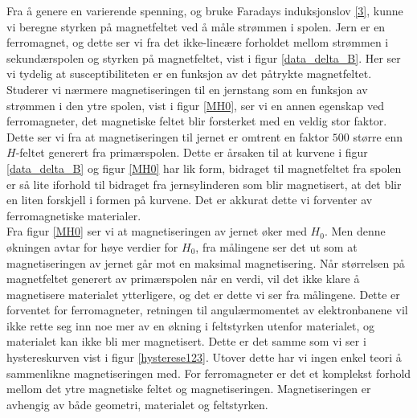 \documentclass[%
 reprint,
 amsmath,amssymb,
 aps,
 norsk,
]{revtex4-1}
\begin{document}
Fra å genere en varierende spenning, og bruke Faradays induksjonslov \eqref{3}, kunne vi beregne styrken på magnetfeltet ved å måle strømmen i spolen. Jern er en ferromagnet, og dette ser vi fra det ikke-lineære forholdet mellom strømmen i sekundærspolen og styrken på magnetfeltet, vist i figur \vref{data_delta_B}. Her ser vi tydelig at susceptibiliteten er en funksjon av det påtrykte magnetfeltet. Studerer vi nærmere magnetiseringen til en jernstang som en funksjon av strømmen i den ytre spolen, vist i figur \vref{MH0}, ser vi en annen egenskap ved ferromagneter, det magnetiske feltet blir forsterket med en veldig stor faktor. Dette ser vi fra at magnetiseringen til jernet er omtrent en faktor $500$ større enn $H$-feltet generert fra primærspolen. Dette er årsaken til at kurvene i figur \vref{data_delta_B} og figur \vref{MH0} har lik form, bidraget til magnetfeltet fra spolen er så lite iforhold til bidraget fra jernsylinderen som blir magnetisert, at det blir en liten forskjell i formen på kurvene. Det er akkurat dette vi forventer av ferromagnetiske materialer.\\
Fra figur \vref{MH0} ser vi at magnetiseringen av jernet øker med $H_0$. Men denne økningen avtar for høye verdier for $H_0$, fra målingene ser det ut som at magnetiseringen av jernet går mot en maksimal magnetisering. Når størrelsen på magnetfeltet generert av primærspolen når en verdi, vil det ikke klare å magnetisere materialet ytterligere, og det er dette vi ser fra målingene. Dette er forventet for ferromagneter, retningen til angulærmomentet av elektronbanene vil ikke rette seg inn noe mer av en økning i feltstyrken utenfor materialet, og materialet kan ikke bli mer magnetisert. Dette er det samme som vi ser i hystereskurven vist i figur \vref{hysterese123}. Utover dette har vi ingen enkel teori å sammenlikne magnetiseringen med. For ferromagneter er det et komplekst forhold mellom det ytre magnetiske feltet og magnetiseringen. Magnetiseringen er avhengig av både geometri, materialet og feltstyrken.
\end{document}
